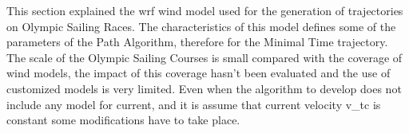 




This section explained the \acrshort{wrf} wind model used for the generation of trajectories on Olympic Sailing Races. The characteristics of this model defines some of the parameters of the Path Algorithm, therefore for the Minimal Time trajectory. The scale of the Olympic Sailing Courses is small compared with the coverage of wind models, the impact of this coverage hasn't been evaluated and the use of customized models is very limited. Even when the algorithm to develop does not include any model for current, and it is assume that current velocity \acrshort{v_tc} is constant some modifications have to take place. 